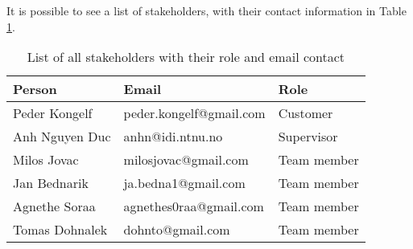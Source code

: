 It is possible to see a list of stakeholders, with their contact information in Table \ref{tab:stakeholders_summary}.

\begin{table}[!ht]\centering
\caption{List of all stakeholders with their role and email contact}
\label{tab:stakeholders_summary}
\def\arraystretch{1.3}
\begin{tabular}{lll}
\toprule[0.5mm]
\textbf{Person} & \textbf{Email} & \textbf{Role}\\
\midrule
Peder Kongelf & peder.kongelf@gmail.com  & Customer\\
\midrule
Anh Nguyen Duc	 & anhn@idi.ntnu.no & Supervisor \\
\midrule
Milos Jovac &  milosjovac@gmail.com & Team member  \\
Jan Bednarik &  ja.bedna1@gmail.com & Team member\\
Agnethe Soraa & agnethes0raa@gmail.com & Team member  \\
Tomas Dohnalek & dohnto@gmail.com & Team member \\
\bottomrule[0.5mm]
\end{tabular}
\end{table}

